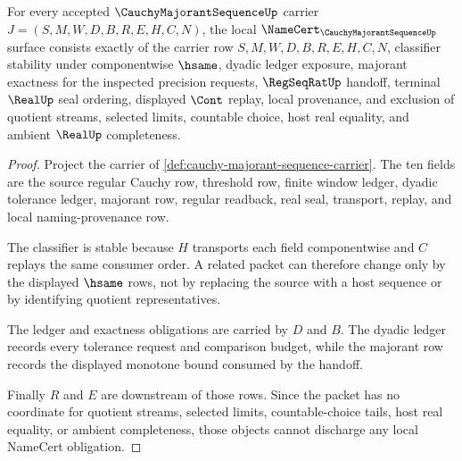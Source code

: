 \begin{theorem}
\label{thm:cauchy-majorant-sequence-namecert-obligations}
For every accepted $\CauchyMajorantSequenceUp$ carrier $J=(S,M,W,D,B,R,E,H,C,N)$, the local $\NameCert_{\CauchyMajorantSequenceUp}$ surface consists exactly of the carrier row $S,M,W,D,B,R,E,H,C,N$, classifier stability under componentwise $\hsame$, dyadic ledger exposure, majorant exactness for the inspected precision requests, $\RegSeqRatUp$ handoff, terminal $\RealUp$ seal ordering, displayed $\Cont$ replay, local provenance, and exclusion of quotient streams, selected limits, countable choice, host real equality, and ambient $\RealUp$ completeness.
\end{theorem}
\begin{proof}
Project the carrier of \autoref{def:cauchy-majorant-sequence-carrier}. The ten fields are the source regular Cauchy row, threshold row, finite window ledger, dyadic tolerance ledger, majorant row, regular readback, real seal, transport, replay, and local naming-provenance row.

The classifier is stable because $H$ transports each field componentwise and $C$ replays the same consumer order. A related packet can therefore change only by the displayed $\hsame$ rows, not by replacing the source with a host sequence or by identifying quotient representatives.

The ledger and exactness obligations are carried by $D$ and $B$. The dyadic ledger records every tolerance request and comparison budget, while the majorant row records the displayed monotone bound consumed by the handoff.

Finally $R$ and $E$ are downstream of those rows. Since the packet has no coordinate for quotient streams, selected limits, countable-choice tails, host real equality, or ambient completeness, those objects cannot discharge any local NameCert obligation.
\end{proof}

